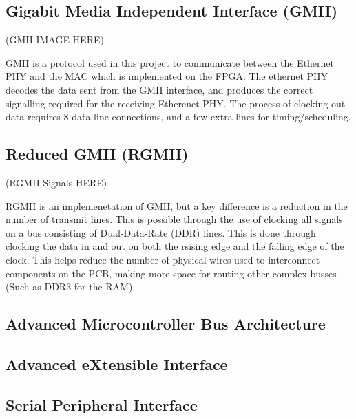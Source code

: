 \subsection{Gigabit Media Independent Interface (GMII)}

(GMII IMAGE HERE)

\par GMII is a protocol used in this project to communicate between the Ethernet PHY and the MAC which is implemented 
on the FPGA. The ethernet PHY decodes the data sent from the GMII interface, and produces the correct signalling 
required for the receiving Etherenet PHY. The process of clocking out data requires 8 data line connections, 
and a few extra lines for timing/scheduling.

\subsection{Reduced GMII (RGMII)}

(RGMII Signals HERE)

\par RGMII is an implemenetation of GMII, but a key difference is a reduction in the number of transmit lines. This is
possible through the use of clocking all signals on a bus consisting of Dual-Data-Rate (DDR) lines. This is done through 
clocking the data in and out on both the rsising edge and the falling edge of the clock. This helps reduce the number
of physical wires used to interconnect components on the PCB, making more space for routing other complex busses (Such as
DDR3 for the RAM).

\subsection{Advanced Microcontroller Bus Architecture}

\subsection{Advanced eXtensible Interface}

\subsection{Serial Peripheral Interface}
